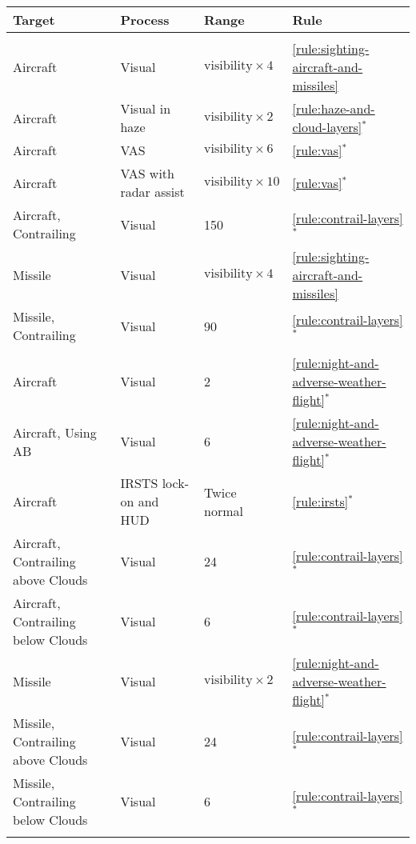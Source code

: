 {

\begin{twocolumntablefloat}

\begin{twocolumntable}
\small
\begin{tabularx}{0.7\linewidth}{llLl}
\toprule
Target&Process&Range&Rule\\
\midrule
{}\\
\midrule
Aircraft&Visual&$\mbox{visibility} \times 4$&\ref{rule:sighting-aircraft-and-missiles}\\
Aircraft&Visual in haze&$\mbox{visibility} \times 2$&\ref{rule:haze-and-cloud-layers}$^*$\\
Aircraft&VAS &$\mbox{visibility} \times 6$&\ref{rule:vas}$^*$\\
Aircraft&VAS with radar assist&$\mbox{visibility} \times 10$&\ref{rule:vas}$^*$\\
Aircraft, Contrailing&Visual&150&\ref{rule:contrail-layers}$^*$\\
Missile&Visual&$\mbox{visibility} \times 4$&\ref{rule:sighting-aircraft-and-missiles}\\
Missile, Contrailing&Visual&90&\ref{rule:contrail-layers}$^*$\\
\midrule
{}\\
\midrule
Aircraft&Visual&2&\ref{rule:night-and-adverse-weather-flight}$^*$\\
Aircraft, Using AB&Visual&6&\ref{rule:night-and-adverse-weather-flight}$^*$\\
Aircraft&IRSTS lock-on and HUD&Twice normal&\ref{rule:irsts}$^*$\\
Aircraft, Contrailing above Clouds&Visual&24&\ref{rule:contrail-layers}$^*$\\
Aircraft, Contrailing below Clouds&Visual&6&\ref{rule:contrail-layers}$^*$\\
Missile&Visual&$\mbox{visibility} \times 2$&\ref{rule:night-and-adverse-weather-flight}$^*$\\
Missile, Contrailing above Clouds&Visual&24&\ref{rule:contrail-layers}$^*$\\
Missile, Contrailing below Clouds&Visual&6&\ref{rule:contrail-layers}$^*$\\
\midrule
{}\\

\end{tabularx}
\end{twocolumntable}
\end{twocolumntablefloat}}
